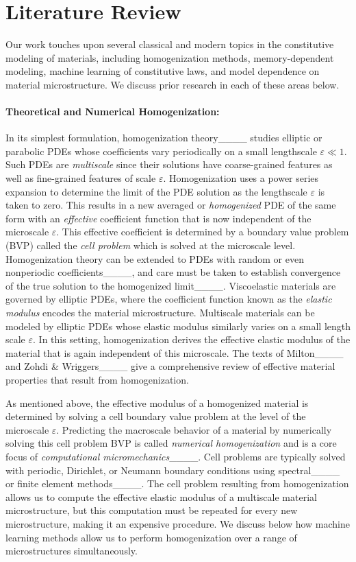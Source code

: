 \section{Literature Review}
\label{ssec:LR}
Our work touches upon several classical and modern topics in the constitutive modeling of materials, including homogenization methods, memory-dependent modeling, machine learning of constitutive laws, and model dependence on material microstructure. We discuss prior research in each of these areas below.

\paragraph{Theoretical and Numerical Homogenization:} In its simplest formulation, homogenization theory____ studies elliptic or parabolic PDEs whose coefficients vary periodically on a small lengthscale $\varepsilon \ll 1$. Such PDEs are \textit{multiscale} since their solutions have coarse-grained features as well as fine-grained features of scale $\varepsilon$. Homogenization uses a power series expansion to determine the limit of the PDE solution as the lengthscale $\varepsilon$ is taken to zero. This results in a new averaged or \textit{homogenized} PDE of the same form with an \textit{effective} coefficient function that is now independent of the microscale $\varepsilon$. This effective coefficient is determined by a boundary value problem (BVP) called the \textit{cell problem} which is solved at the microscale level. Homogenization theory can be extended to PDEs with random or even nonperiodic coefficients____, and care must be taken to establish convergence of the true solution to the homogenized limit____. Viscoelastic materials are governed by elliptic PDEs, where the coefficient function known as the \textit{elastic modulus} encodes the material microstructure. Multiscale materials can be modeled by elliptic PDEs whose elastic modulus similarly varies on a small length scale $\varepsilon$. In this setting, homogenization derives the effective elastic modulus of the material that is again independent of this microscale. The texts of Milton____ and Zohdi \& Wriggers____ give a comprehensive review of effective material properties that result from homogenization. 

As mentioned above, the effective modulus of a homogenized material is determined by solving a cell boundary value problem at the level of the microscale $\varepsilon$. Predicting the macroscale behavior of a material by numerically solving this cell problem BVP is called \textit{numerical homogenization} and is a core focus of \textit{computational micromechanics}____. Cell problems are typically solved with periodic, Dirichlet, or Neumann boundary conditions using spectral____ or finite element methods____. The cell problem resulting from homogenization allows us to compute the effective elastic modulus of a multiscale material microstructure, but this computation must be repeated for every new microstructure, making it an expensive procedure. We discuss below how machine learning methods allow us to perform homogenization over a range of microstructures simultaneously.~\\

